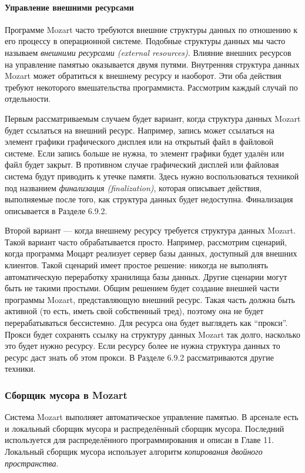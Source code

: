\paragraph{Управление внешними ресурсами}

Программе Mozart часто требуются внешние структуры данных по отношению к его процессу в операционной системе. Подобные структуры данных мы часто называем \emph{внешними ресурсами (external resources)}. Влияние внешних ресурсов на управление памятью оказывается двумя путями. Внутренняя структура данных Mozart может обратиться к внешнему ресурсу и наоборот. Эти оба действия требуют некоторого вмешательства программиста. Рассмотрим каждый случай по отдельности.

Первым рассматриваемым случаем будет вариант, когда структура данных Mozart будет ссылаться на внешний ресурс. Например, запись может ссылаться на элемент графики графического дисплея или на открытый файл в файловой системе. Если запись больше не нужна, то элемент графики будет удалён или файл будет закрыт. В противном случае графический дисплей или файловая система будут приводить к утечке памяти. Здесь нужно воспользоваться техникой под названием \emph{финализация (finalization)}, которая описывает действия, выполняемые после того, как структура данных будет недоступна. Финализация описывается в Разделе 6.9.2.

Второй вариант --- когда внешнему ресурсу требуется структура данных Mozart. Такой вариант часто обрабатывается просто. Например, рассмотрим сценарий, когда программа Моцарт реализует сервер базы данных, доступный для внешних клиентов. Такой сценарий имеет простое решение: никогда не выполнять автоматическую переработку хранилища базы данных. Другие сценарии могут быть не такими простыми. Общим решением будет создание внешней части программы Mozart, представляющую внешний ресурс. Такая часть должна быть активной (то есть, иметь свой собственный тред), поэтому она не будет перерабатываться бессистемно. Для ресурса она будет выглядеть как ``прокси''. Прокси будет сохранять ссылку на структуру данных Mozart так долго, насколько это будет нужно ресурсу. Если ресурсу более не нужна структура данных то ресурс даст знать об этом прокси. В Разделе 6.9.2 рассматриваются другие техники.

\subsubsection{Сборщик мусора в Mozart}

Система Mozart выполняет автоматическое управление памятью. В арсенале есть и локальный сборщик мусора и распределённый сборщик мусора. Последний используется для распределённого программирования и описан в Главе 11. Локальный сборщик мусора использует алгоритм \emph{копирования двойного пространства}.

